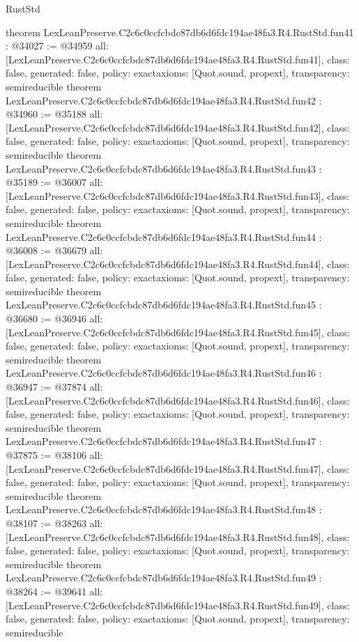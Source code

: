 \begin{lexlean}{RustStd}
\begin{coremodule}
{}
theorem LexLeanPreserve.C2c6c0ccfcbdc87db6d6fdc194ae48fa3.R4.RustStd.fun41 : @34027 := @34959 {
  all: [LexLeanPreserve.C2c6c0ccfcbdc87db6d6fdc194ae48fa3.R4.RustStd.fun41],
  class: false,
  generated: false,
  policy: exact{axioms: [Quot.sound, propext]},
  transparency: semireducible
}
theorem LexLeanPreserve.C2c6c0ccfcbdc87db6d6fdc194ae48fa3.R4.RustStd.fun42 : @34960 := @35188 {
  all: [LexLeanPreserve.C2c6c0ccfcbdc87db6d6fdc194ae48fa3.R4.RustStd.fun42],
  class: false,
  generated: false,
  policy: exact{axioms: [Quot.sound, propext]},
  transparency: semireducible
}
theorem LexLeanPreserve.C2c6c0ccfcbdc87db6d6fdc194ae48fa3.R4.RustStd.fun43 : @35189 := @36007 {
  all: [LexLeanPreserve.C2c6c0ccfcbdc87db6d6fdc194ae48fa3.R4.RustStd.fun43],
  class: false,
  generated: false,
  policy: exact{axioms: [Quot.sound, propext]},
  transparency: semireducible
}
theorem LexLeanPreserve.C2c6c0ccfcbdc87db6d6fdc194ae48fa3.R4.RustStd.fun44 : @36008 := @36679 {
  all: [LexLeanPreserve.C2c6c0ccfcbdc87db6d6fdc194ae48fa3.R4.RustStd.fun44],
  class: false,
  generated: false,
  policy: exact{axioms: [Quot.sound, propext]},
  transparency: semireducible
}
theorem LexLeanPreserve.C2c6c0ccfcbdc87db6d6fdc194ae48fa3.R4.RustStd.fun45 : @36680 := @36946 {
  all: [LexLeanPreserve.C2c6c0ccfcbdc87db6d6fdc194ae48fa3.R4.RustStd.fun45],
  class: false,
  generated: false,
  policy: exact{axioms: [Quot.sound, propext]},
  transparency: semireducible
}
theorem LexLeanPreserve.C2c6c0ccfcbdc87db6d6fdc194ae48fa3.R4.RustStd.fun46 : @36947 := @37874 {
  all: [LexLeanPreserve.C2c6c0ccfcbdc87db6d6fdc194ae48fa3.R4.RustStd.fun46],
  class: false,
  generated: false,
  policy: exact{axioms: [Quot.sound, propext]},
  transparency: semireducible
}
theorem LexLeanPreserve.C2c6c0ccfcbdc87db6d6fdc194ae48fa3.R4.RustStd.fun47 : @37875 := @38106 {
  all: [LexLeanPreserve.C2c6c0ccfcbdc87db6d6fdc194ae48fa3.R4.RustStd.fun47],
  class: false,
  generated: false,
  policy: exact{axioms: [Quot.sound, propext]},
  transparency: semireducible
}
theorem LexLeanPreserve.C2c6c0ccfcbdc87db6d6fdc194ae48fa3.R4.RustStd.fun48 : @38107 := @38263 {
  all: [LexLeanPreserve.C2c6c0ccfcbdc87db6d6fdc194ae48fa3.R4.RustStd.fun48],
  class: false,
  generated: false,
  policy: exact{axioms: [Quot.sound, propext]},
  transparency: semireducible
}
theorem LexLeanPreserve.C2c6c0ccfcbdc87db6d6fdc194ae48fa3.R4.RustStd.fun49 : @38264 := @39641 {
  all: [LexLeanPreserve.C2c6c0ccfcbdc87db6d6fdc194ae48fa3.R4.RustStd.fun49],
  class: false,
  generated: false,
  policy: exact{axioms: [Quot.sound, propext]},
  transparency: semireducible
}
\end{coremodule}
\end{lexlean}
